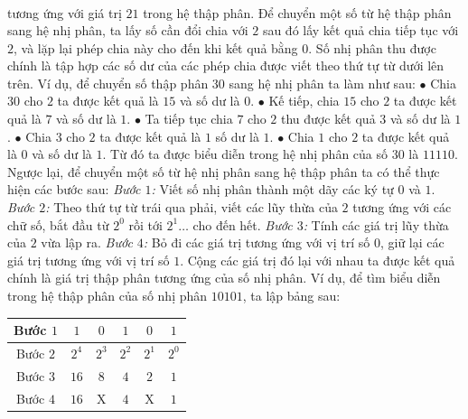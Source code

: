 \begin{multicols}{2}
\begin{align*}
	\end{align*}
	tương ứng với giá trị $21$ trong hệ thập phân. 
	\vskip 0.1cm
	Để chuyển một số từ hệ thập phân sang hệ nhị phân, ta lấy số cần đổi chia với $2$ sau đó lấy kết quả chia tiếp tục với $2$, và lặp lại phép chia này cho đến khi kết quả bằng $0$. Số nhị phân thu được chính là tập hợp các số dư của các phép chia được viết theo thứ tự từ dưới lên trên. Ví dụ, để chuyển số thập phân $30$ sang hệ nhị phân ta làm như sau:
	\vskip 0.1cm 
	$\bullet$ Chia $30$ cho $2$ ta được kết quả là $15$ và số dư là $0$.
	\vskip 0.1cm
	$\bullet$ Kế tiếp, chia $15$ cho $2$ ta được kết quả là $7$ và số dư là $1$.
	\vskip 0.1cm
	$\bullet$ Ta tiếp tục chia $7$ cho $2$ thu được kết quả $3$ và số dư là $1$.
	\vskip 0.1cm
	$\bullet$ Chia $3$ cho $2$ ta được kết quả là $1$ số dư là $1$.
	\vskip 0.1cm
	$\bullet$ Chia $1$ cho $2$ ta được kết quả là $0$ và số dư là $1$. 
	\vskip 0.1cm
	Từ đó ta được biểu diễn trong hệ nhị phân của số $30$ là $11110$.
	\vskip 0.1cm 
	Ngược lại, để chuyển một số từ hệ nhị phân sang hệ thập phân ta có thể thực hiện các bước sau:
	\vskip 0.1cm 
	\textit{Bước $1$:} Viết số nhị phân thành một dãy các ký tự $0$ và $1$.
	\vskip 0.1cm
	\textit{Bước $2$:} Theo thứ tự từ trái qua phải, viết các lũy thừa của $2$ tương ứng với các chữ số, bắt đầu từ $2^0$ rồi tới $2^1\ldots$ cho đến hết.
	\vskip 0.1cm
	\textit{Bước $3$:} Tính các giá trị lũy thừa của $2$ vừa lập ra. 
	\vskip 0.1cm
	\textit{Bước $4$:}  Bỏ đi các giá trị tương ứng với vị trí số $0$, giữ lại các giá trị tương ứng với vị trí số $1$. Cộng các giá trị đó lại với nhau ta được kết quả chính là giá trị thập phân tương ứng của số nhị phân.
	\vskip 0.1cm
	Ví dụ, để tìm biểu diễn trong hệ thập phân của số nhị phân $10101$, ta lập bảng sau:
	\begin{table}[H]
		\vspace*{-5pt}
		\centering
		\captionsetup{labelformat= empty, justification=centering}
		\renewcommand{\arraystretch}{1.3}
		\setlength{\tabcolsep}{9pt}
		\begin{tabular}{|c|c|c|c|c|c|}
			\hline
			Bước $1$&	$1$	&$0$&	$1$&	$0$&	$1$\\
			\hline
			Bước $2$&	$2^4$&	$2^3$&	$2^2$&	$2^1$&	$2^0$\\
			\hline
			Bước $3$&	$16$&	$8$&	$4$&	$2$&	$1$\\
			\hline
			Bước $4$&	$16$&	X&	$4$	&X	&$1$\\
			\hline
		\end{tabular}
		\vspace*{-5pt}
	\end{table}

\end{multicols}

